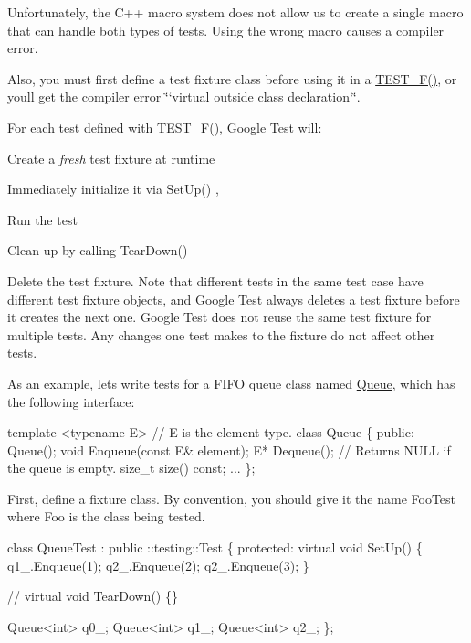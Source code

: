 Unfortunately, the C++ macro system does not allow us to create a single macro that can handle both types of tests. Using the wrong macro causes a compiler error.

Also, you must first define a test fixture class before using it in a {\ttfamily \hyperlink{gtest_8h_a0ee66d464d1a06c20c1929cae09d8758}{T\+E\+S\+T\+\_\+\+F()}}, or you\textquotesingle{}ll get the compiler error \char`\"{}`virtual outside class
declaration`\char`\"{}.

For each test defined with {\ttfamily \hyperlink{gtest_8h_a0ee66d464d1a06c20c1929cae09d8758}{T\+E\+S\+T\+\_\+\+F()}}, Google Test will\+:
\begin{DoxyEnumerate}
\item Create a {\itshape fresh} test fixture at runtime
\end{DoxyEnumerate}
\begin{DoxyEnumerate}
\item Immediately initialize it via {\ttfamily Set\+Up()} ,
\end{DoxyEnumerate}
\begin{DoxyEnumerate}
\item Run the test
\end{DoxyEnumerate}
\begin{DoxyEnumerate}
\item Clean up by calling {\ttfamily Tear\+Down()}
\end{DoxyEnumerate}
\begin{DoxyEnumerate}
\item Delete the test fixture. Note that different tests in the same test case have different test fixture objects, and Google Test always deletes a test fixture before it creates the next one. Google Test does not reuse the same test fixture for multiple tests. Any changes one test makes to the fixture do not affect other tests.
\end{DoxyEnumerate}

As an example, let\textquotesingle{}s write tests for a F\+I\+FO queue class named {\ttfamily \hyperlink{classQueue}{Queue}}, which has the following interface\+: 
\begin{DoxyCode}
template <typename E> // E is the element type.
class Queue \{
 public:
  Queue();
  void Enqueue(const E& element);
  E* Dequeue(); // Returns NULL if the queue is empty.
  size\_t size() const;
  ...
\};
\end{DoxyCode}


First, define a fixture class. By convention, you should give it the name {\ttfamily Foo\+Test} where {\ttfamily Foo} is the class being tested. 
\begin{DoxyCode}
class QueueTest : public ::testing::Test \{
 protected:
  virtual void SetUp() \{
    q1\_.Enqueue(1);
    q2\_.Enqueue(2);
    q2\_.Enqueue(3);
  \}

  // virtual void TearDown() \{\}

  Queue<int> q0\_;
  Queue<int> q1\_;
  Queue<int> q2\_;
\};
\end{DoxyCode}


